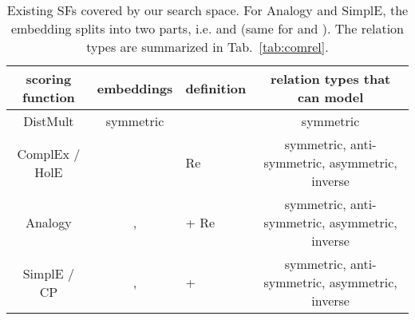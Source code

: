 \documentclass[conference]{IEEEtran}
\begin{document}
\begin{table*}[ht]
	\centering
	\caption{Existing SFs covered by our search space.
		For Analogy and SimplE,
		the embedding splits into two parts,
		i.e.  
		and  (same for  and ).
		The relation types are summarized in Tab.~\ref{tab:comrel}.
	}
	\vspace{-7px}
	\label{tab:scofun}
	\renewcommand{\arraystretch}{1.4}
\begin{tabular}{c|c|C{4cm}|c}
		\hline
		scoring function                               &                                                                   embeddings                                                                    &                                                                                                 definition                                            &      relation types that can model                    \\ \hline
		DistMult \cite{yang2014embedding}                      &            symmetric                                                                         &                                                                                                                                      &      symmetric               \\ \hline
		{ComplEx \cite{trouillon2017knowledge} / HolE \cite{nickel2016holographic}} &                                                                                    &                                                     Re                                       &    symmetric, anti-symmetric, asymmetric, inverse       \\ \hline
		Analogy \cite{liu2017analogical}              & ,  &  + Re &	symmetric, anti-symmetric, asymmetric, inverse	\\ \hline
		{SimplE \cite{kazemi2018simple} / CP \cite{lacroix2018canonical}}      &      ,        &                     +               &  symmetric, anti-symmetric, asymmetric, inverse   \\ \hline
	\end{tabular} 
	\vspace{-10px}
\end{table*}
\end{document}
